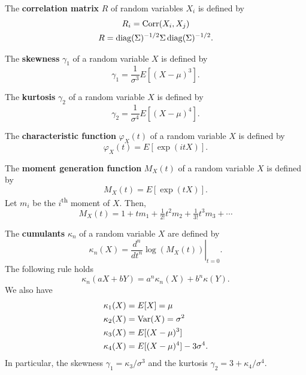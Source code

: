 \begin{outline}
\1 The \textbf{correlation matrix} $R$ of random variables $X_i$ is defined by
\begin{gather*}
  R_{i}= \operatorname{Corr}(X_i,X_j)\\
  R = \operatorname{diag}(\Sigma)^{-1/2}\Sigma\operatorname{diag}(\Sigma)^{-1/2}.
\end{gather*}

\1 The \textbf{skewness} $\gamma_1$ of a random variable $X$ is defined by
\begin{equation*}
  \gamma_1 = \frac{1}{\sigma^3}E[(X-\mu)^3].
\end{equation*}

\1 The \textbf{kurtosis} $\gamma_2$ of a random variable $X$ is defined by
\begin{equation*}
  \gamma_2 = \frac{1}{\sigma^4}E[(X-\mu)^4].
\end{equation*}

\1 The \textbf{characteristic function} $\varphi_X(t)$ of a random variable $X$ is defined by
\begin{equation*}
  \varphi_X(t) = E[\exp(itX)].
\end{equation*}

\1 The \textbf{moment generation function} $M_X(t)$ of a random variable $X$ is defined by
\begin{equation*}
  M_X(t) = E[\exp(tX)].
\end{equation*}
Let $m_i$ be the $i$\textsuperscript{th} moment of $X$. Then,
\begin{equation*}
  M_X(t) = 1+tm_1 + \tfrac{1}{2!}t^2m_2 + \tfrac{1}{3!} t^3m_3 + \cdots
\end{equation*}

\1 The \textbf{cumulants} $\kappa_n$ of a random variable $X$ are defined by
\begin{equation*}
  \kappa_n(X) = \left.\frac{d^n}{dt^n}\log(M_X(t))\right\vert_{t=0}.
\end{equation*}
The following rule holds
\begin{equation*}
  \kappa_n(aX + bY) = a^n\kappa_n(X) + b^n\kappa(Y).
\end{equation*}
We also have
\begin{align*}
  \kappa_1(X) &= E[X]=\mu\\
  \kappa_2(X) &= \operatorname{Var}(X) = \sigma^2\\
  \kappa_3(X) &= E[(X-\mu)^3]\\
  \kappa_4(X) &= E[(X-\mu)^4] - 3\sigma^4.
\end{align*}
In particular, the skewness $\gamma_1 = \kappa_3/\sigma^3$ and the kurtosis $\gamma_2 =
3+\kappa_4/\sigma^4$. 
\end{outline}


